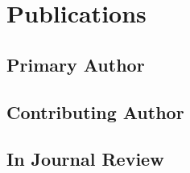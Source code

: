 \documentclass[]{friggeri-cv} %
\begin{document}
\section{Publications}


\subsection{Primary Author}

\newrefcontext[sorting=ydnt]
\begin{refsection}
    \nocite{*}
    \printbibliography[heading=none, keyword={primary}]
\end{refsection}


\subsection{Contributing Author}
\begin{refsection}
	\nocite{*}
	\printbibliography[heading=none, keyword={secondary}]
\end{refsection}


\subsection{In Journal Review}
\begin{refsection}
	\nocite{*}
	\printbibliography[heading=none, keyword={draft}]
\end{refsection}







\end{document}
